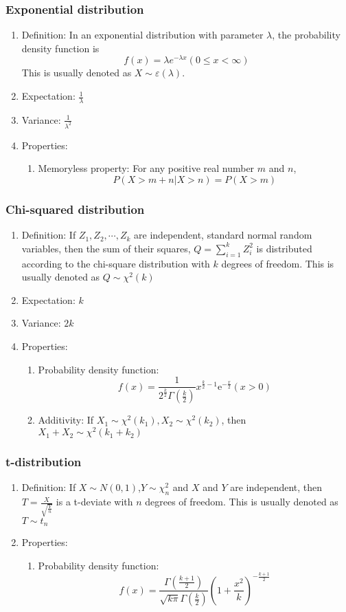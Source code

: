 \documentclass[a4paper]{article}
\begin{document}
	\subsubsection{Exponential distribution}
		\begin{enumerate}
		\item Definition: In an exponential distribution with parameter $\lambda$, the probability density function is 
$$f(x)=\lambda e^{-\lambda x}(0\leq x<\infty)$$
This is usually denoted as $X\sim \varepsilon(\lambda)$.
		\item Expectation: $\frac{1}{\lambda}$
		\item Variance:	$\frac{1}{\lambda^2}$
		\item Properties:
			\begin{enumerate}
			\item Memoryless property: For any positive real number $m$ and $n$,
$$P(X>m+n|X>n)=P(X>m)$$
			\end{enumerate}
		\end{enumerate}
	\subsubsection{Chi-squared distribution}
		\begin{enumerate}
		\item Definition: If $Z_1,Z_2,\cdots,Z_k$ are independent, standard normal random variables, then the sum of their squares, $Q=\sum_{i=1}^kZ_i^2$ is distributed according to the chi-square distribution with $k$ degrees of freedom. This is usually denoted as $Q\sim\chi^2(k)$  
		\item Expectation: $k$
		\item Variance: $2k$
		\item Properties:
			\begin{enumerate}
			\item Probability density function:
$$f(x)=\frac{1}{2^{\frac{k}{2}}\Gamma(\frac{k}{2})}x^{\frac{k}{2}-1}\mathrm{e}^{-\frac{x}{2}}(x>0)$$
			\item Additivity: If $X_1\sim\chi^2(k_1), X_2\sim\chi^2(k_2)$, then $X_1+X_2\sim\chi^2(k_1+k_2)$
			\end{enumerate}
		\end{enumerate}
	\subsubsection{t-distribution}
		\begin{enumerate}
		\item Definition: If $X\sim N(0,1)$,$Y\sim \chi_n^2$ and $X$ and $Y$ are independent, then $T=\frac{X}{\sqrt{\frac{Y}{n}}}$ is a t-deviate with $n$ degrees of freedom. This is usually denoted as $T\sim t_n$
		\item Properties:
			\begin{enumerate}
			\item Probability density function:
$$f(x)=\frac{\Gamma(\frac{k+1}{2})}{\sqrt{k\pi}\Gamma(\frac{k}{2})}\left(1+\frac{x^2}{k}\right)^{-\frac{k+1}{2}}$$
			\end{enumerate}
		\end{enumerate}
\end{document}
